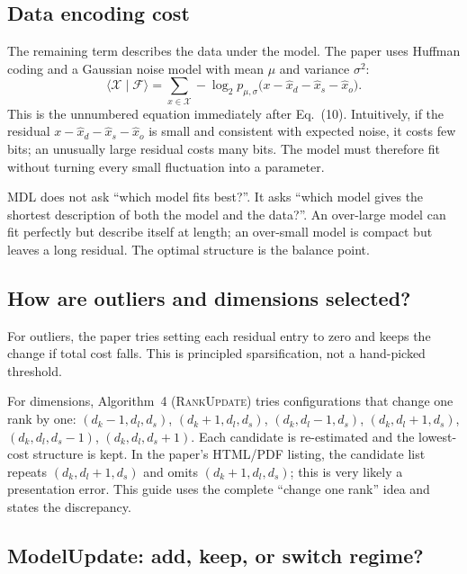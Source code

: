 \subsection{Data encoding cost}

The remaining term describes the data under the model. The paper uses Huffman coding and a Gaussian
noise model with mean $\mu$ and variance $\sigma^2$:
\begin{equation}
  \bigl\langle\mathcal{X}\mid\mathcal{F}\bigr\rangle
  =\sum_{x\in\mathcal{X}}
   -\log_2 p_{\mu,\sigma}
   \bigl(x-\widehat{x}_d-\widehat{x}_s-\widehat{x}_o\bigr).
  \label{eq:data-cost}
\end{equation}
This is the unnumbered equation immediately after Eq.~(10). Intuitively, if the residual
$x-\widehat{x}_d-\widehat{x}_s-\widehat{x}_o$ is small and consistent with expected noise, it costs few
bits; an unusually large residual costs many bits. The model must therefore fit without turning every
small fluctuation into a parameter.

\begin{plainwords}
MDL does not ask ``which model fits best?''. It asks ``which model gives the shortest description of
both the model and the data?''. An over-large model can fit perfectly but describe itself at length; an
over-small model is compact but leaves a long residual. The optimal structure is the balance point.
\end{plainwords}

\subsection{How are outliers and dimensions selected?}

For outliers, the paper tries setting each residual entry to zero and keeps the change if total cost
falls. This is principled sparsification, not a hand-picked threshold.

For dimensions, Algorithm~4 (\textsc{RankUpdate}) tries configurations that change one rank by one:
$(d_k-1,d_l,d_s)$, $(d_k+1,d_l,d_s)$, $(d_k,d_l-1,d_s)$, $(d_k,d_l+1,d_s)$,
$(d_k,d_l,d_s-1)$, $(d_k,d_l,d_s+1)$. Each candidate is re-estimated and the lowest-cost structure is
kept. In the paper's HTML/PDF listing, the candidate list repeats $(d_k,d_l+1,d_s)$ and omits
$(d_k+1,d_l,d_s)$; this is very likely a presentation error. This guide uses the complete
``change one rank'' idea and states the discrepancy.

\subsection{ModelUpdate: add, keep, or switch regime?}

